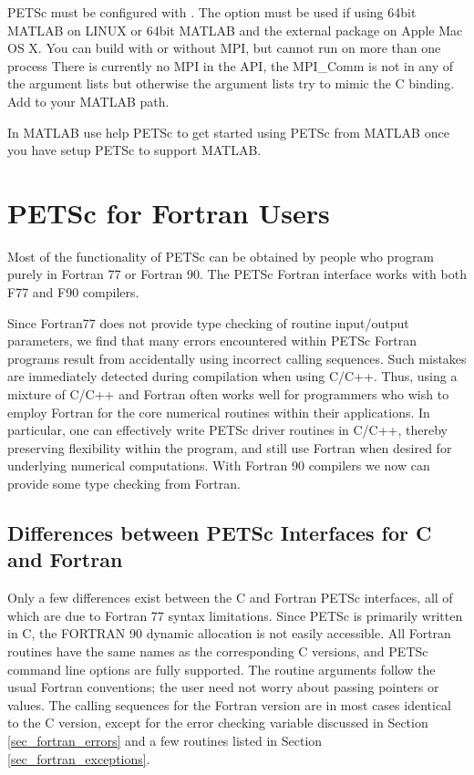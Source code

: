 PETSc must be configured with    . The option  must be used if using 64bit MATLAB on LINUX or 64bit MATLAB and the  external package on Apple Mac OS X.
You can build with or without MPI, but cannot run on more than one process
There is currently no MPI in the API, the MPI_Comm is not in any of the argument lists but otherwise the argument lists try to mimic the C binding.
Add  to your MATLAB path.

In MATLAB use help PETSc to get started using PETSc from MATLAB once you have setup PETSc to support MATLAB.


\cleardoublepage
\chapter{PETSc for Fortran Users}
\label{ch_fortran}

Most of the functionality of PETSc can be obtained by people who
program purely in Fortran 77 or Fortran 90.
The PETSc Fortran interface works with both F77 and F90 compilers.

Since Fortran77 does not provide type checking of routine input/output
parameters, we find that many errors encountered within PETSc Fortran
programs result from accidentally using incorrect calling sequences.
Such mistakes are immediately detected during compilation when using
C/C++.  Thus, using a mixture of C/C++ and Fortran often works well
for programmers who wish to employ Fortran for the core numerical
routines within their applications.  In particular, one can
effectively write PETSc driver routines in C/C++, thereby preserving
flexibility within the program, and still use Fortran when desired for
underlying numerical computations. With Fortran 90 compilers we now
can provide some type checking from Fortran.

\section{Differences between PETSc Interfaces for C and Fortran}

Only a few differences exist between the C and Fortran PETSc
interfaces, all of which are due to Fortran 77 syntax limitations.
Since PETSc is primarily written in C, the FORTRAN 90
dynamic allocation is not easily accessible.
All Fortran routines have the same names as the corresponding C
versions, and PETSc command line options are fully supported. The
routine arguments follow the usual Fortran conventions; the user need
not worry about passing pointers or values.  The calling sequences
for the Fortran version are in most cases identical to the C version,
except for the error checking variable discussed in
Section \ref{sec_fortran_errors} and a few routines listed in
Section \ref{sec_fortran_exceptions}.

